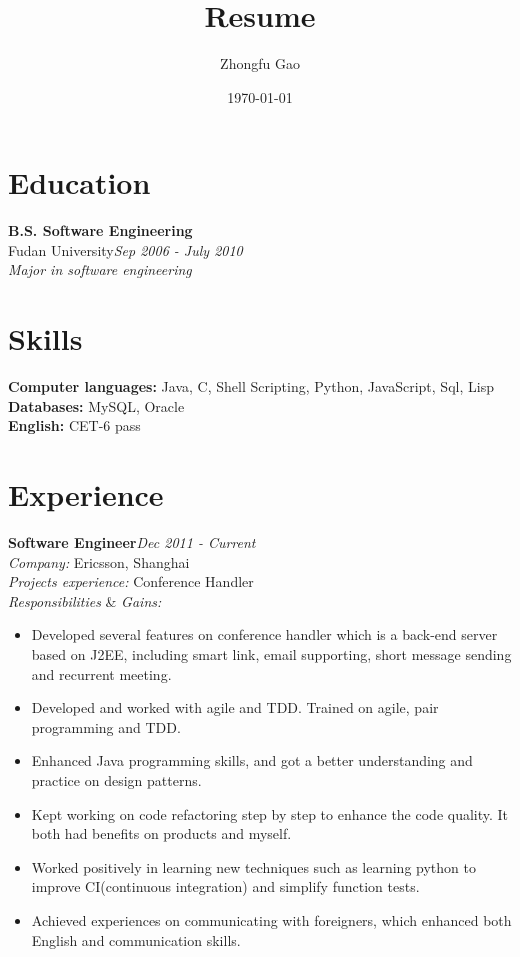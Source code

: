 \documentclass[line, margin, 11pt]{res}
\author{Zhongfu Gao}
\title{Resume}
\date{\today}
\begin{document}
\renewcommand{\namefont}{ \LARGE \bf } %
\address{{\bf Email: }joshuafufu@gmail.com}
\address{{\bf Mobile: }(+86)15921928229}

\begin{resume}

\section{Education}
{\bf B.S. Software Engineering}\\
Fudan University\hfill {\it Sep 2006 - July 2010}\\
{\sl Major in software engineering}

\section{Skills}
{\bf Computer languages:} Java, C, Shell Scripting, Python, JavaScript, Sql, Lisp \\
{\bf Databases:} MySQL, Oracle\\
{\bf English:} CET-6 pass


\section{Experience}

{\bf Software Engineer}\hfill {\it Dec 2011 - Current}\\
{\sl Company:} Ericsson, Shanghai\\
{\sl Projects experience:} Conference Handler\\
{\sl Responsibilities} \& {\sl Gains:}
\begin{itemize}
\item Developed several features on conference handler which is a back-end server based on J2EE, including smart link, email supporting, short message sending and recurrent meeting.
\item Developed and worked with agile and TDD. Trained on agile, pair programming and TDD.
\item Enhanced Java programming skills, and got a better understanding and practice on design patterns.
\item Kept working on code refactoring step by step to enhance the code quality. It both had benefits on products and myself.
\item Worked positively in learning new techniques such as learning python to improve CI(continuous integration) and simplify function tests.
\item Achieved experiences on communicating with foreigners, which enhanced both English and communication skills.
\end{itemize}


\end{resume}
\end{document}

